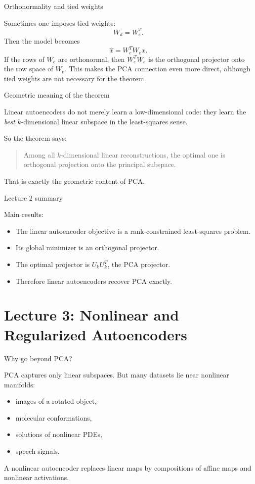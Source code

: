 \documentclass[aspectratio=169]{beamer}
\begin{document}
\begin{frame}{Orthonormality and tied weights}

Sometimes one imposes tied weights:
\[
W_d = W_e^T.
\]
Then the model becomes
\[
\hat x = W_e^T W_e x.
\]
If the rows of \(W_e\) are orthonormal, then \(W_e^TW_e\) is the orthogonal projector onto the row space of \(W_e\).
This makes the PCA connection even more direct, although tied weights are not necessary for the theorem.

\end{frame}

\begin{frame}{Geometric meaning of the theorem}

Linear autoencoders do not merely learn a low-dimensional code:
they learn the \emph{best} \(k\)-dimensional linear subspace in the least-squares sense.

So the theorem says:
\begin{quote}
Among all \(k\)-dimensional linear reconstructions, the optimal one is orthogonal projection onto the principal subspace.
\end{quote}
That is exactly the geometric content of PCA.

\end{frame}

\begin{frame}{Lecture 2 summary}

Main results:
\begin{itemize}
\item The linear autoencoder objective is a rank-constrained least-squares problem.
\item Its global minimizer is an orthogonal projector.
\item The optimal projector is \(U_kU_k^T\), the PCA projector.
\item Therefore linear autoencoders recover PCA exactly.
\end{itemize}

\end{frame}

\section{Lecture 3: Nonlinear and Regularized Autoencoders}

\begin{frame}{Why go beyond PCA?}

PCA captures only linear subspaces.
But many datasets lie near nonlinear manifolds:
\begin{itemize}
\item images of a rotated object,
\item molecular conformations,
\item solutions of nonlinear PDEs,
\item speech signals.
\end{itemize}
A nonlinear autoencoder replaces linear maps by compositions of affine maps and nonlinear activations.

\end{frame}
\end{document}
